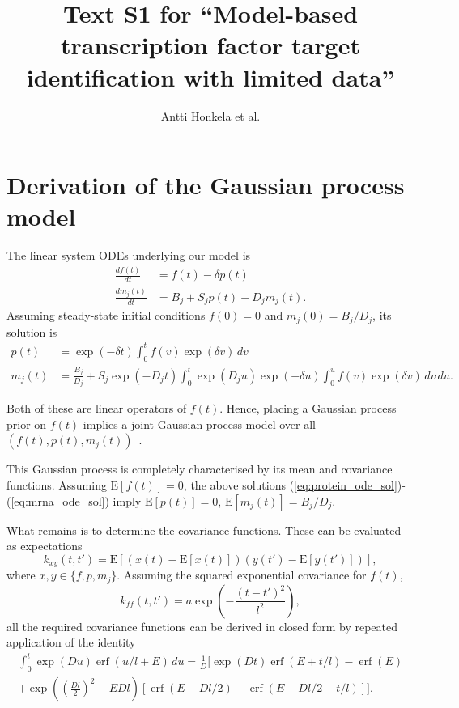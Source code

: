 \documentclass{article}
\title{Text S1 for ``Model-based transcription factor
  target identification with limited data''}
\author{Antti Honkela et al.}
\date{}
\newcommand{\erf}{\operatorname{erf}}
\begin{document}
\maketitle

\section{Derivation of the Gaussian process model}

The linear system ODEs underlying our model is
\begin{align}
  \label{eq:translation_ode}
  \frac{df(t)}{dt} & = f(t) - \delta p(t) \\
  \label{eq:translation_ode}
  \frac{dm_j(t)}{dt} & = B_j + S_j p(t) - D_j m_j(t).
\end{align}
Assuming steady-state initial conditions $f(0) = 0$ and
$m_j(0) = B_j / D_j$, its solution is
\begin{align}
  \label{eq:protein_ode_sol}
  p(t) & = \exp(-\delta t) \int_0^t f(v) \exp(\delta v) \, dv \\
  \label{eq:mrna_ode_sol}
  m_j(t) & = \frac{B_j}{D_j} + S_j \exp(-D_j t) \int_0^t \exp(D_j
  u) \exp(-\delta u) \int_0^u f(v) \exp(\delta v) \, dv \, du.
\end{align}

Both of these are linear operators of $f(t)$.  Hence, placing a
Gaussian process prior on $f(t)$ implies a joint Gaussian process
model over all $(f(t), p(t), m_j(t))$~\cite{Rasmussen2006}.

This Gaussian process is completely characterised by its mean and
covariance functions.  Assuming $\mathrm{E}[f(t)] = 0$, the above
solutions (\ref{eq:protein_ode_sol})-(\ref{eq:mrna_ode_sol}) imply
$\mathrm{E}[p(t)] = 0$, $\mathrm{E}[m_j(t)] = B_j / D_j$.

What remains is to determine the covariance functions.  These can
be evaluated as expectations
\begin{equation}
  \label{eq:kernel_definition}
  k_{xy}(t,t') = \mathrm{E}[(x(t) - \mathrm{E}[x(t)])(y(t') - \mathrm{E}[y(t')])],
\end{equation}
where $x,y \in \{f, p, m_j\}$.  Assuming the squared exponential
covariance for $f(t)$,
\begin{equation}
  \label{eq:sqexp_kernel}
  k_{ff}(t, t') = a \exp\left( -\frac{(t-t')^2}{l^2} \right),
\end{equation}
all the required covariance functions can be derived in closed form
by repeated application of the identity
\begin{multline}
  \label{eq:gpsim_identity}
  \int_0^t \exp(D u) \erf(u/l + E)\,du =
  \frac{1}{D} \bigg[
  \exp(Dt) \erf(E + t/l) - \erf(E) \\
  + \exp\left(\left( \frac{Dl}{2}\right)^2 -E Dl \right)
  [ \erf(E - Dl/2) - \erf(E-Dl/2+t/l) ]
  \bigg].
\end{multline}
\end{document}
